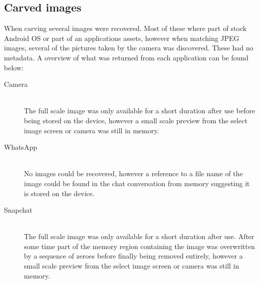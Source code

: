 \subsection{Carved images}
When carving several images were recovered. Most of these where part of stock Android OS or part of an applications assets, however when matching JPEG images, several of the pictures taken by the camera was discovered. These had no metadata. A overview of what was returned from each application can be found below:
\begin{description}
\item[Camera]\hfill\\
The full scale image was only available for a short duration after use before being stored on the device, however a small scale preview from the select image screen or camera was still in memory.
\item[WhatsApp]\hfill\\
No images could be recovered, however a reference to a file name of the image could be found in the chat conversation from memory suggesting it is stored on the device.
\item[Snapchat]\hfill\\
The full scale image was only available for a short duration after use. After some time part of the memory region containing the image was overwritten by a sequence of zeroes before finally being removed entirely, however a small scale preview from the select image screen or camera was still in memory.
\end{description}